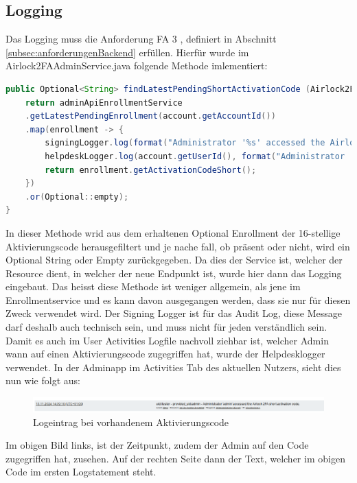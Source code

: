 \subsection{Logging}
Das Logging muss die Anforderung \flqq FA 3\frqq{} , definiert in Abschnitt \ref{subsec:anforderungenBackend} erfüllen. Hierfür wurde im Airlock2FAAdminService.java folgende Methode imlementiert:
\begin{lstlisting}[language=Java]
	public Optional<String> findLatestPendingShortActivationCode (Airlock2FAUserAccount account) {
	return adminApiEnrollmentService
	.getLatestPendingEnrollment(account.getAccountId())
	.map(enrollment -> {
		signingLogger.log(format("Administrator '%s' accessed the Airlock 2FA short activation code of user '%s'.", administrator.getName(), account.getUserId()));
		helpdeskLogger.log(account.getUserId(), format("Administrator '%s' accessed the Airlock 2FA short activation code.", administrator.getName()));
		return enrollment.getActivationCodeShort();
	})
	.or(Optional::empty);
}
\end{lstlisting}
In dieser Methode wrid aus dem erhaltenen Optional Enrollment der 16-stellige Aktivierungscode herausgefiltert und je nache fall, ob präsent oder nicht, wird ein Optional String oder Empty zurückgegeben. Da dies der Service ist, welcher der Resource dient, in welcher der neue Endpunkt ist, wurde hier dann das Logging eingebaut. Das heisst diese Methode ist weniger allgemein, als jene im Enrollmentservice und es kann davon ausgegangen werden, dass sie nur für diesen Zweck verwendet wird. Der Signing Logger ist für das Audit Log, diese Message darf deshalb auch technisch sein, und muss nicht für jeden verständlich sein.
Damit es auch im User Activities Logfile nachvoll ziehbar ist, welcher Admin wann auf einen Aktivierungscode zugegriffen hat, wurde der Helpdesklogger verwendet. In der Adminapp im Activities Tab des aktuellen Nutzers, sieht dies nun wie folgt aus:
\begin{figure}[H]
	\begin{center}
		\includegraphics[width=1.0\textwidth]{ressourcen/logpresent}
		\caption[Logeintrag bei vorhandenem Aktivierungscode]{Logeintrag bei vorhandenem Aktivierungscode}\label{fig:logpresent}
	\end{center}
\end{figure}
\noindent Im obigen Bild links, ist der Zeitpunkt, zudem der Admin auf den Code zugegriffen hat, zusehen. Auf der rechten Seite dann der Text, welcher im obigen Code im ersten Logstatement steht. 

